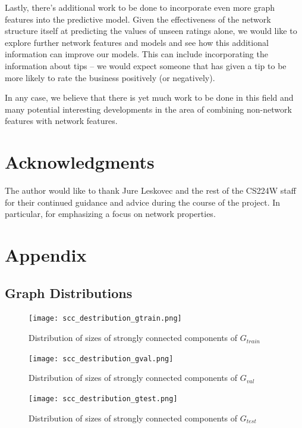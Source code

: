 \documentclass[letterpaper, 10 pt, conference]{ieeeconf}  %
\begin{document}
Lastly, there's additional work to be done to incorporate even more graph features into the predictive model. Given the effectiveness of the network structure itself at predicting the values of unseen ratings alone, we would like to explore further network features and models and see how this additional information can improve our models. This can include incorporating the information about tips -- we would expect someone that has given a tip to be more likely to rate the business positively (or negatively).

In any case, we believe that there is yet much work to be done in this field and many potential interesting developments in the area of combining non-network features with network features.


\section{Acknowledgments}
The author would like to thank Jure Leskovec and the rest of the CS224W staff for their continued guidance and advice during the course of the project. In particular, for emphasizing a focus on network properties.

{}


\section{Appendix}

\subsection{Graph Distributions}
\label{sec:graph_distributions}
\begin{figure}[h!]
\centering
\texttt{[image: scc\_destribution\_gtrain.png]}
\caption{Distribution of sizes of strongly connected components of $G_{train}$}
\label{fig:distribution_scc_g_train}
\end{figure}
\begin{figure}[h!]
\centering
\texttt{[image: scc\_destribution\_gval.png]}
\caption{Distribution of sizes of strongly connected components of $G_{val}$}
\label{fig:distribution_scc_g_val}
\end{figure}
\begin{figure}[h!]
\centering
\texttt{[image: scc\_destribution\_gtest.png]}
\caption{Distribution of sizes of strongly connected components of $G_{test}$}
\label{fig:distribution_scc_g_test}
\end{figure}
\end{document}
